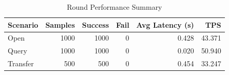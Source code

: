\begin{table}
\caption{Round Performance Summary}
\label{tab:round_perf}
\begin{tabular}{lrrrrr}
\toprule
Scenario & Samples & Success & Fail & Avg Latency (s) & TPS \\
\midrule
Open & 1000 & 1000 & 0 & 0.428 & 43.371 \\
Query & 1000 & 1000 & 0 & 0.020 & 50.940 \\
Transfer & 500 & 500 & 0 & 0.454 & 33.247 \\
\bottomrule
\end{tabular}
\end{table}
